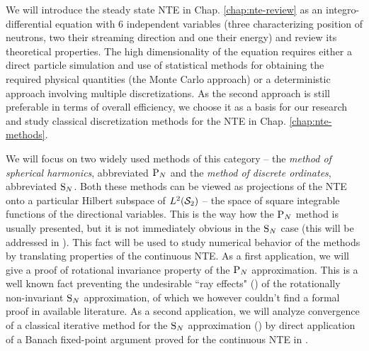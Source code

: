 We will introduce the steady state NTE in Chap. \ref{chap:nte-review} as an integro-differential equation with 6
independent variables (three characterizing position of neutrons, two their streaming direction and one
their energy) and review its theoretical properties.
The high dimensionality of the equation requires either a direct particle simulation and use of statistical
methods for obtaining the required physical quantities (the Monte Carlo approach) or a deterministic approach involving
multiple discretizations.
As the second approach is still preferable in terms of overall efficiency, we choose it as a basis for our research and
study classical discretization methods for the NTE in Chap. \ref{chap:nte-methods}. 

We will focus on two widely used methods of this category -- the \textit{method of spherical harmonics}, abbreviated
$\PN$ and the \textit{method of discrete ordinates}, abbreviated
$\SN$. Both these methods can be viewed as projections of the NTE
onto a particular Hilbert subspace of $\Lp[2](\Sphere)$ --  the space of square integrable functions of the directional
variables. This is the way how the $\PN$ method is usually presented, but it is not
immediately obvious in the $\SN$ case (this will be addressed in ).  This fact will be used to
study numerical behavior of the methods by translating properties of the continuous NTE. As a first application, we will
give a proof of rotational invariance property of the $\PN$ approximation. This is a well known fact preventing the
undesirable ``ray effects" () of the rotationally non-invariant $\SN$
approximation, of which we however couldn't find a formal proof in available literature. As a second application, we will analyze convergence of a
classical iterative method for the $\SN$ approximation () by direct application of a Banach fixed-point
argument proved for the continuous NTE in \cite{Egger}.

